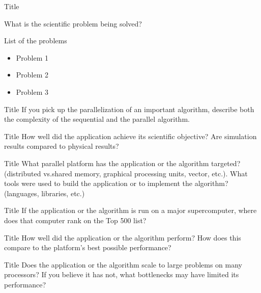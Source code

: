\documentclass[aspectratio=43]{beamer}
\begin{document}
\begin{frame}[fragile]{Title}

What is the scientific problem being solved?
\begin{block}{List of the problems}
    \begin{itemize}
        \item Problem 1
        \item Problem 2
        \item Problem 3
    \end{itemize}
\end{block}

\end{frame}
\begin{frame}[fragile]{Title}
If you pick up the parallelization of an important algorithm, describe both the complexity of the sequential and the parallel algorithm.
\end{frame}
\begin{frame}[fragile]{Title}
How well did the application achieve its scientific objective? Are simulation results compared to physical results?
\end{frame}
\begin{frame}[fragile]{Title}
What parallel platform has the application or the algorithm targeted? (distributed vs.shared memory, graphical processing units, vector, etc.). What tools were used to build the application or to implement the algorithm? (languages, libraries, etc.)
\end{frame}
\begin{frame}[fragile]{Title}
If the application or the algorithm is run on a major supercomputer, where does that computer rank on the Top 500 list?
\end{frame}
\begin{frame}[fragile]{Title}
How well did the application or the algorithm perform? How does this compare to the platform’s best possible performance?
\end{frame}
\begin{frame}[fragile]{Title}
Does the application or the algorithm scale to large problems on many processors? If you believe it has not, what bottlenecks may have limited its performance?
\end{frame}
\end{document}

